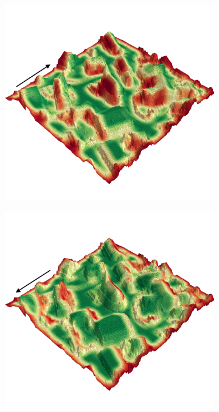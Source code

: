 \documentclass[../document.tex]{subfiles}
\begin{document}
\begin{figure} [htbp]
  \centering
  \begin{subfigure}[b]{0.45\textwidth}
    \includegraphics[width=\linewidth]{../img/4/traversability/sullens/-270.png} 
  \end{subfigure}
  \begin{subfigure}[b]{0.45\textwidth}
      \includegraphics[width=\linewidth]{../img/4/traversability/sullens/-90.png}

\end{subfigure}
\end{figure}
\end{document}
